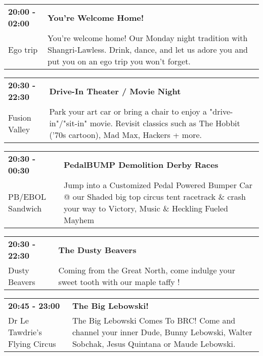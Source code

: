 \begin{tabular}{ p{1in} p{2.2in} }
    \textbf{20:00 - 02:00} & \textbf{You're Welcome Home!} \\
    Ego trip \newline  & You're welcome home! Our Monday night tradition with Shangri-Lawless. Drink, dance, and let us adore you and put you on an ego trip you won't forget. \\
    \hline 
\end{tabular}
    
\begin{tabular}{ p{1in} p{2.2in} }
    \textbf{20:30 - 22:30} & \textbf{Drive-In Theater / Movie Night} \\
    Fusion Valley \newline  & Park your art car or bring a chair to enjoy a "drive-in"/"sit-in" movie. Revisit classics such as The Hobbit ('70s cartoon), Mad Max, Hackers + more. \\
    \hline 
\end{tabular}
    
\begin{tabular}{ p{1in} p{2.2in} }
    \textbf{20:30 - 00:30} & \textbf{PedalBUMP Demolition Derby Races} \\
    PB/EBOL Sandwich \newline  & Jump into a Customized Pedal Powered Bumper Car @ our Shaded big top circus tent racetrack \& crash your way to Victory, Music \& Heckling Fueled Mayhem \\
    \hline 
\end{tabular}
    
\begin{tabular}{ p{1in} p{2.2in} }
    \textbf{20:30 - 22:30} & \textbf{The Dusty Beavers} \\
    Dusty Beavers \newline  & Coming from the Great North, come indulge your sweet tooth with our maple taffy ! \\
    \hline 
\end{tabular}
    
\begin{tabular}{ p{1in} p{2.2in} }
    \textbf{20:45 - 23:00} & \textbf{The Big Lebowski!} \\
    Dr Le Tawdrie's Flying Circus \newline  & The Big Lebowski Comes To BRC! Come and channel your inner Dude, Bunny Lebowski, Walter Sobchak, Jesus Quintana or Maude Lebowski. \\
    \hline 
\end{tabular}
    
